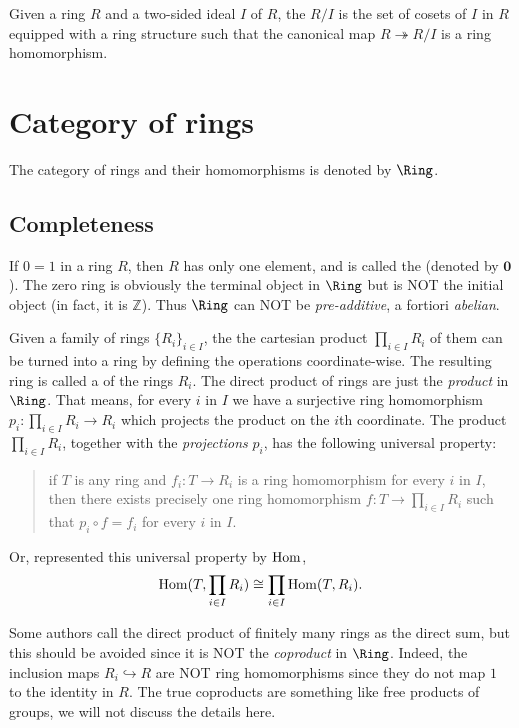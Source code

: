   Given a ring $R$ and a two-sided ideal $I$ of $R$, the  $R/I$ is the set of cosets of $I$ in $R$ equipped with a ring structure such that the canonical map $R\twoheadrightarrow R/I$ is a ring homomorphism.

\newpage
\section{Category of rings}
  The category of rings and their homomorphisms is denoted by $\Ring$.

\subsection{Completeness}

  If $0=1$ in a ring $R$, then $R$ has only one element, and is called the  (denoted by $\mathbf{0}$).
  The zero ring is obviously the terminal object in $\Ring$ but is NOT the initial object (in fact, it is $\mathbb{Z}$). Thus $\Ring$ can NOT be \emph{pre-additive}, a fortiori \emph{abelian}.

  Given a family of rings $\{R_i\}_{i\in I}$, the the cartesian product $\prod_{i\in I}R_i$ of them can be turned into a ring by defining the operations coordinate-wise. The resulting ring is called a  of the rings $R_i$. The direct product of rings are just the \emph{product} in $\Ring$. That means, for every $i$ in $I$ we have a surjective ring homomorphism $p_i\colon \prod_{i\in I}R_i\to R_i$ which projects the product on the $i$th coordinate. The product $\prod_{i\in I}R_i$, together with the \emph{projections} $p_i$, has the following universal property:
  \begin{quote}
    if $T$ is any ring and $f_i\colon T\to R_i$ is a ring homomorphism for every $i$ in $I$, then there exists precisely one ring homomorphism $f\colon T\to \prod_{i\in I}R_i$ such that $p_i\circ f = f_i$ for every $i$ in  $I$.
  \end{quote}
  Or, represented this universal property by $\operatorname{Hom}$,
  \begin{equation*}
    \operatorname{Hom}(T,\prod_{i\in I}R_i) \cong \prod_{i\in I}\operatorname{Hom}(T,R_i).
  \end{equation*}
  \begin{rem}
    Some authors call the direct product of finitely many rings as the direct sum, but this should be avoided since it is NOT the \emph{coproduct} in $\Ring$. Indeed, the inclusion maps $R_i\hookrightarrow R$ are NOT ring homomorphisms since they do not map $1$ to the identity in $R$.
    The true coproducts are something like free products of groups, we will not discuss the details here.
  \end{rem}

